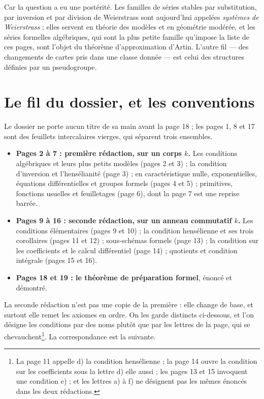 \documentclass[11pt,a4paper]{article}
\begin{document}
\begin{resume}
Car la question a eu une postérité. Les familles de séries stables par
substitution, par inversion et par division de Weierstrass sont aujourd'hui
appelées \emph{systèmes de Weierstrass} ; elles servent en théorie des modèles
et en géométrie modérée, et les séries formelles algébriques, qui sont la plus
petite famille qu'impose la liste de ces pages, sont l'objet du théorème
d'approximation d'Artin. L'autre fil — des changements de cartes pris dans une
classe donnée — est celui des structures définies par un pseudogroupe.

\end{resume}

\section*{Le fil du dossier, et les conventions}

Le dossier ne porte aucun titre de sa main avant la page 18 ; les pages 1, 8
et 17 sont des feuillets intercalaires vierges, qui séparent trois ensembles.

\begin{itemize}
  \item \textbf{Pages 2 à 7 : première rédaction, sur un corps $k$.} Les
    conditions algébriques et leurs plus petits modèles (pages 2 et 3) ; la
    condition d'inversion et l'hensélianité (page 3) ; en caractéristique
    nulle, exponentielles, équations différentielles et groupes formels
    (pages 4 et 5) ; primitives, fonctions usuelles et feuilletages (page 6),
    dont la page 7 est une reprise barrée.
  \item \textbf{Pages 9 à 16 : seconde rédaction, sur un anneau commutatif
    $k$.} Les conditions élémentaires (pages 9 et 10) ; la condition
    hensélienne et ses trois corollaires (pages 11 et 12) ; sous-schémas
    formels (page 13) ; la condition sur les coefficients et le calcul
    différentiel (page 14) ; quotients et condition intégrale (pages 15 et
    16).
  \item \textbf{Pages 18 et 19 : le théorème de préparation formel}, énoncé
    et démontré.
\end{itemize}

La seconde rédaction n'est pas une copie de la première : elle change de
base, et surtout elle remet les axiomes en ordre. On les garde distincts
ci-dessous, et l'on désigne les conditions par des noms plutôt que par les
lettres de la page, qui se chevauchent\footnote{La page 11 appelle d) la
condition hensélienne ; la page 14 ouvre la condition sur les coefficients
sous la lettre d) elle aussi ; les pages 13 et 15 invoquent une condition e) ;
et les lettres a) à f) ne désignent pas les mêmes énoncés dans les deux
rédactions.}. La correspondance est la suivante.
\end{document}
